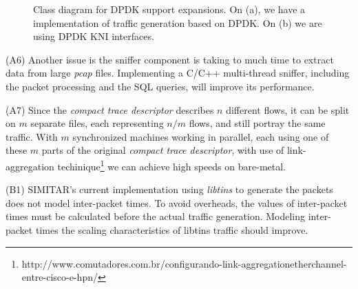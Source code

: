 \begin{figure}[h!]
    \centering
    \hspace{0mm}
    \caption{Class diagram for DPDK support expansions. On (a), we have a implementation of traffic generation based on DPDK. On (b) we are using DPDK KNI interfaces.}
    \label{fig:DpdkFlow}
\end{figure}

(A6) Another issue is the sniffer component is taking to much time to extract data from large \textit{pcap} files. Implementing a C/C++ multi-thread sniffer, including the packet processing and the SQL queries, will improve its performance. 


(A7) Since the \textit{compact trace descriptor} describes $n$ different flows, it can be split on $m$ separate files, each representing $n/m$ flows, and still portray the same traffic. With $m$ synchronized machines working in parallel, each using one of these $m$ parts of the original \textit{compact trace descriptor}, with use of link-aggregation techinique\footnote{http://www.comutadores.com.br/configurando-link-aggregationetherchannel-entre-cisco-e-hpn/} we can achieve high speeds on bare-metal. 

(B1) SIMITAR's current implementation using \textit{libtins} to generate the packets does not model inter-packet times. To avoid overheads,  the values of inter-packet times must be calculated before the actual traffic generation. Modeling inter-packet times the scaling characteristics of libtins traffic should improve. 


